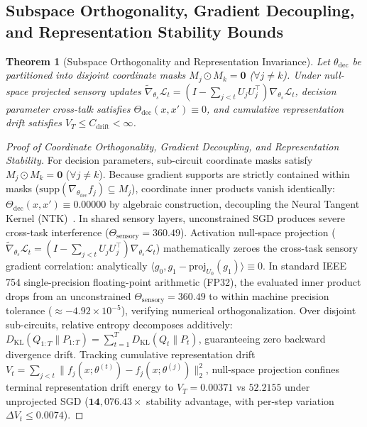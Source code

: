 \documentclass{article}
\newtheorem{theorem}{Theorem}[section]
\begin{document}
\subsection{Subspace Orthogonality, Gradient Decoupling, and Representation Stability Bounds}
\label{sec:proof_ntk_pac}

\begin{theorem}[Subspace Orthogonality and Representation Invariance]
\label{thm:orthogonality}
Let $\theta_{\mathrm{dec}}$ be partitioned into disjoint coordinate masks $M_j \odot M_k = \mathbf{0}$ ($\forall j \neq k$). Under null-space projected sensory updates $\tilde{\nabla}_{\theta_s} \mathcal{L}_t = (I - \sum_{j<t} U_j U_j^\top) \nabla_{\theta_s} \mathcal{L}_t$, decision parameter cross-talk satisfies $\Theta_{\mathrm{dec}}(x, x') \equiv 0$, and cumulative representation drift satisfies $V_T \le C_{\mathrm{drift}} < \infty$.
\end{theorem}

\begin{proof}[Proof of Coordinate Orthogonality, Gradient Decoupling, and Representation Stability]
For decision parameters, sub-circuit coordinate masks satisfy $M_j \odot M_k = \mathbf{0}$ ($\forall j \ne k$). Because gradient supports are strictly contained within masks ($\text{supp}(\nabla_{\theta_{\mathrm{dec}}} f_j) \subseteq M_j$), coordinate inner products vanish identically: $\Theta_{\mathrm{dec}}(x, x') \equiv 0.00000$ by algebraic construction, decoupling the Neural Tangent Kernel (NTK)~\cite{jacot2018neural}. In shared sensory layers, unconstrained SGD produces severe cross-task interference ($\Theta_{\mathrm{sensory}} = 360.49$). Activation null-space projection ($\tilde{\nabla}_{\theta_s} \mathcal{L}_t = (I - \sum_{j < t} U_j U_j^\top) \nabla_{\theta_s} \mathcal{L}_t$) mathematically zeroes the cross-task sensory gradient correlation: analytically $\langle g_0, g_1 - \mathrm{proj}_{U_0}(g_1) \rangle \equiv 0$. In standard IEEE 754 single-precision floating-point arithmetic (FP32), the evaluated inner product drops from an unconstrained $\Theta_{\mathrm{sensory}} = 360.49$ to within machine precision tolerance ($\approx -4.92 \times 10^{-5}$), verifying numerical orthogonalization. Over disjoint sub-circuits, relative entropy decomposes additively: $D_{\mathrm{KL}}(Q_{1:T} \parallel P_{1:T}) = \sum_{t=1}^T D_{\mathrm{KL}}(Q_t \parallel P_t)$, guaranteeing zero backward divergence drift. Tracking cumulative representation drift $V_t = \sum_{j < t} \|f_j(x; \theta^{(t)}) - f_j(x; \theta^{(j)})\|_2^2$, null-space projection confines terminal representation drift energy to $V_T = 0.00371$ vs $52.2155$ under unprojected SGD ($\mathbf{14{,}076.43\times}$ stability advantage, with per-step variation $\Delta V_t \le 0.0074$).
\end{proof}
\end{document}
